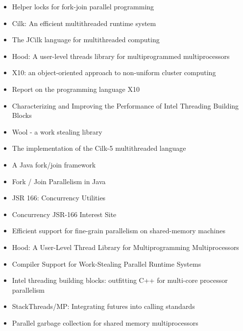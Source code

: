\begin{itemize}
\item[\textbullet] Helper locks for fork-join parallel programming
  \cite{Agrawal2010}
\item[\checkmark] Cilk: An efficient multithreaded runtime system
  \cite{Blumofe1995}
\item[\checkmark] The JCilk language for multithreaded computing
  \cite{Danaher2005}
\item[\textbullet] Hood: A user-level threads library for
  multiprogrammed multiprocessors \cite{Blumofe1998}
\item[\textbullet] X10: an object-oriented approach to non-uniform
  cluster computing \cite{Charles2005}
\item[\textbullet] Report on the programming language X10
  \cite{Saraswat2010}
\item[\checkmark] Characterizing and Improving the Performance of
  Intel Threading Building Blocks \cite{Contreras2008}
\item[\texttimes] Wool - a work stealing library \cite{Faxen2009}
\item[\checkmark] The implementation of the Cilk-5 multithreaded
  language \cite{Frigo1998}
\item[\checkmark] A Java fork/join framework \cite{Lea2000}
\item[\checkmark] Fork / Join Parallelism in Java \cite{Lea2000a}
\item[\checkmark] JSR 166: Concurrency Utilities \cite{Lea2004}
\item[\checkmark] Concurrency JSR-166 Interest Site \cite{Lea2006}
\item[\textbullet] Efficient support for fine-grain parallelism on
  shared-memory machines \cite{Lowenthal1998}
\item[\textbullet] Hood: A User-Level Thread Library for
  Multiprogramming Multiprocessors \cite{Papadopoulos1998}
\item[\textbullet] Compiler Support for Work-Stealing Parallel Runtime
  Systems \cite{Raman2009}
\item[\checkmark] Intel threading building blocks: outfitting C++ for
  multi-core processor parallelism \cite{Reinders2007}
\item[\textbullet] StackThreads/MP: Integrating futures into calling
  standards \cite{Taura1999}
\item[\checkmark] Parallel garbage collection for shared memory
  multiprocessors \cite{Flood2001}
\end{itemize}


